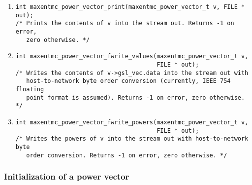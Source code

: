 \documentclass[12pt]{amsart}
\numberwithin{equation}{section}
\begin{document}
\begin{enumerate}[1.]
\begin{verbatim}
int maxentmc_power_vector_compute_polynomial_ca(maxentmc_power_vector_t v,
                                                maxentmc_float_t * x,
                                                maxentmc_float_t * result);
/* The constant arity version of the previous function. The point is
   given by x[0]$,\ldots,$x[dim-1]. */
\end{verbatim}
\item \begin{verbatim}
int maxentmc_power_vector_print(maxentmc_power_vector_t v, FILE * out);
/* Prints the contents of v into the stream out. Returns -1 on error,
   zero otherwise. */
\end{verbatim}
\item \begin{verbatim}
int maxentmc_power_vector_fwrite_values(maxentmc_power_vector_t v,
                                        FILE * out);
/* Writes the contents of v->gsl_vec.data into the stream out with
   host-to-network byte order conversion (currently, IEEE 754 floating
   point format is assumed). Returns -1 on error, zero otherwise. */
\end{verbatim}
\item \begin{verbatim}
int maxentmc_power_vector_fwrite_powers(maxentmc_power_vector_t v,
                                        FILE * out);
/* Writes the powers of v into the stream out with host-to-network byte
   order conversion. Returns -1 on error, zero otherwise. */
\end{verbatim}
\end{enumerate}

\subsubsection{Initialization of a power vector}
\end{document}
